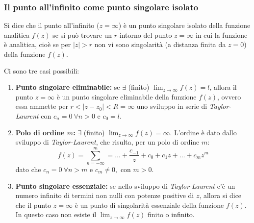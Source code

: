 \subsubsection*{Il punto all'infinito come punto singolare isolato}
\begin{definition}
 Si dice che il punto all'infinito ($z=\infty$) è un punto singolare isolato della funzione analitica $f(z)$ se si può trovare un $r$-intorno del punto $z=\infty$ in cui la funzione è analitica, cioè se per $|z|>r$ non vi sono singolarità (a distanza finita da $z=0$) della funzione $f(z)$.
 \end{definition}
 Ci sono tre casi possibili:
\begin{enumerate}
    \item \textbf{Punto singolare eliminabile:} se $\exists$ (finito) $\displaystyle\lim_{z\to \infty} f(z) =l$, allora il punto $z=\infty$ è un punto singolare eliminabile della funzione $f(z)$, ovvero essa ammette per $r<|z-z_0|<R=\infty$ uno sviluppo in serie di \textit{Taylor-Laurent} con $c_n=0\ \forall n>0\text{ e } c_0=l$.
    \item \textbf{Polo di ordine $m$:} $\exists$ (finito) $\displaystyle\lim_{z\to \infty} f(z) =\infty$. L'ordine è dato dallo sviluppo di \textit{Taylor-Laurent}, che risulta, per un polo di ordine $m$:
    \begin{equation*}
        f(z)=\sum_{n=-\infty}^{m}=\dots +\frac{c_{-1}}{z}+c_0+c_1z+\dots+c_mz^m
    \end{equation*}
    dato che $c_n=0\ \forall n>m\text{ e }c_m\neq0,\text{ con }m>0$.
    
    \item \textbf{Punto singolare essenziale:} se nello sviluppo di \textit{Taylor-Laurent} c'è un numero infinito di termini non nulli con potenze positive di $z$, allora si dice che il punto $z=\infty$ è un punto di singolarità essenziale della funzione $f(z)$. In questo caso non esiste il $\displaystyle \lim_{z\to \infty}f(z)$ finito o infinito.
\end{enumerate}
 
    

